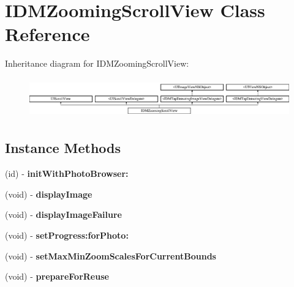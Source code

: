 \hypertarget{interface_i_d_m_zooming_scroll_view}{}\section{I\+D\+M\+Zooming\+Scroll\+View Class Reference}
\label{interface_i_d_m_zooming_scroll_view}
Inheritance diagram for I\+D\+M\+Zooming\+Scroll\+View\+:\begin{figure}[H]
\begin{center}
\leavevmode
\includegraphics[height=1.735537cm]{interface_i_d_m_zooming_scroll_view}
\end{center}
\end{figure}
\subsection*{Instance Methods}
\begin{DoxyCompactItemize}
\item 
\hypertarget{interface_i_d_m_zooming_scroll_view_a2460dd66c7d35377fa16a67bd6707343}{}(id) -\/ {\bfseries init\+With\+Photo\+Browser\+:}\label{interface_i_d_m_zooming_scroll_view_a2460dd66c7d35377fa16a67bd6707343}

\item 
\hypertarget{interface_i_d_m_zooming_scroll_view_a1895c046a4e4d38da75c542a7ab3ed0b}{}(void) -\/ {\bfseries display\+Image}\label{interface_i_d_m_zooming_scroll_view_a1895c046a4e4d38da75c542a7ab3ed0b}

\item 
\hypertarget{interface_i_d_m_zooming_scroll_view_ae5e818ae2669f957ddec9de65e6530d0}{}(void) -\/ {\bfseries display\+Image\+Failure}\label{interface_i_d_m_zooming_scroll_view_ae5e818ae2669f957ddec9de65e6530d0}

\item 
\hypertarget{interface_i_d_m_zooming_scroll_view_a0438a75ae12b16d4e0d2017b22ead8fc}{}(void) -\/ {\bfseries set\+Progress\+:for\+Photo\+:}\label{interface_i_d_m_zooming_scroll_view_a0438a75ae12b16d4e0d2017b22ead8fc}

\item 
\hypertarget{interface_i_d_m_zooming_scroll_view_a465a7c956790b9c78fae3e0602ca5701}{}(void) -\/ {\bfseries set\+Max\+Min\+Zoom\+Scales\+For\+Current\+Bounds}\label{interface_i_d_m_zooming_scroll_view_a465a7c956790b9c78fae3e0602ca5701}

\item 
\hypertarget{interface_i_d_m_zooming_scroll_view_adbd725d769e67a74c06b63ddcf0bd60f}{}(void) -\/ {\bfseries prepare\+For\+Reuse}\label{interface_i_d_m_zooming_scroll_view_adbd725d769e67a74c06b63ddcf0bd60f}

\end{DoxyCompactItemize}
